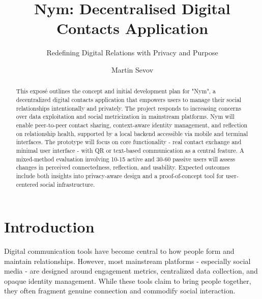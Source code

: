 \documentclass{imc-inf}
\title{Nym: Decentralised Digital Contacts Application}
\subtitle{ Redefining Digital Relations with Privacy and Purpose}
\author{Martin Sevov}
\begin{document}
\let\cleardoublepage\clearpage

\frontmatter\maketitle%
\begin{declarations}\end{declarations}%
%
\tableofcontents%
\clearpage

%
\listoftables
\clearpage



\mainmatter%

\begin{abstract}
This exposé outlines the concept and initial development plan for "Nym", a decentralized digital contacts application that empowers users to manage their social relationships intentionally and privately. The project responds to increasing concerns over data exploitation and social metricization in mainstream platforms. Nym will enable peer-to-peer contact sharing, context-aware identity management, and reflection on relationship health, supported by a local backend accessible via mobile and terminal interfaces. The prototype will focus on core functionality - real contact exchange and minimal user interface - with QR or text-based communication as a central feature. A mixed-method evaluation involving 10-15 active and 30-60 passive users will assess changes in perceived connectedness, reflection, and usability. Expected outcomes include both insights into privacy-aware design and a proof-of-concept tool for user-centered social infrastructure.
\end{abstract}

\chapter{Introduction}
Digital communication tools have become central to how people form and maintain relationships. However, most mainstream platforms - especially social media - are designed around engagement metrics, centralized data collection, and opaque identity management. While these tools claim to bring people together, they often fragment genuine connection and commodify social interaction.
\end{document}
